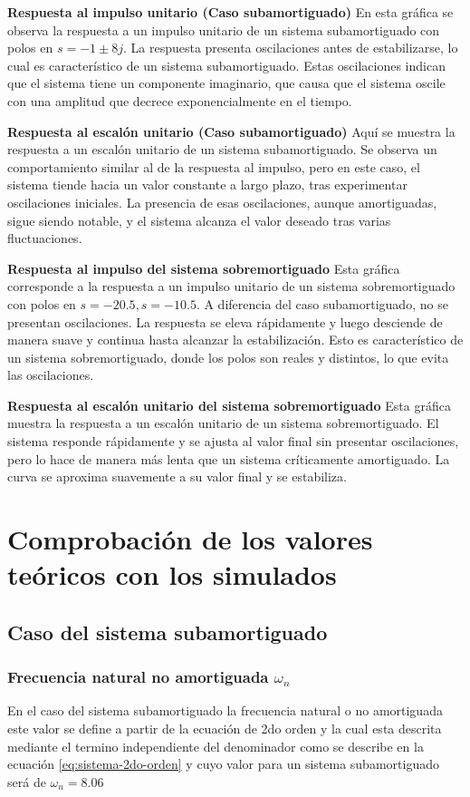 \documentclass[conference]{IEEEtran}
\begin{document}
	\textbf{Respuesta al impulso unitario (Caso subamortiguado)}
	En esta gráfica se observa la respuesta a un impulso unitario de un sistema subamortiguado con polos en $s = -1 \pm 8j$. La respuesta presenta oscilaciones antes de estabilizarse, lo cual es característico de un sistema subamortiguado. Estas oscilaciones indican que el sistema tiene un componente imaginario, que causa que el sistema oscile con una amplitud que decrece exponencialmente en el tiempo.
	
	\textbf{Respuesta al escalón unitario (Caso subamortiguado)}
	Aquí se muestra la respuesta a un escalón unitario de un sistema subamortiguado. Se observa un comportamiento similar al de la respuesta al impulso, pero en este caso, el sistema tiende hacia un valor constante a largo plazo, tras experimentar oscilaciones iniciales. La presencia de esas oscilaciones, aunque amortiguadas, sigue siendo notable, y el sistema alcanza el valor deseado tras varias fluctuaciones.
	
	\textbf{Respuesta al impulso del sistema sobremortiguado}
	Esta gráfica corresponde a la respuesta a un impulso unitario de un sistema sobremortiguado con polos en 
	$ s = -20.5, s = -10.5$. A diferencia del caso subamortiguado, no se presentan oscilaciones. La respuesta se eleva rápidamente y luego desciende de manera suave y continua hasta alcanzar la estabilización. Esto es característico de un sistema sobremortiguado, donde los polos son reales y distintos, lo que evita las oscilaciones.
	
	\textbf{Respuesta al escalón unitario del sistema sobremortiguado}
	Esta gráfica muestra la respuesta a un escalón unitario de un sistema sobremortiguado. El sistema responde rápidamente y se ajusta al valor final sin presentar oscilaciones, pero lo hace de manera más lenta que un sistema críticamente amortiguado. La curva se aproxima suavemente a su valor final y se estabiliza.
	
	\section{Comprobación de los valores teóricos con los simulados}
	\subsection{Caso del sistema subamortiguado}
	\subsubsection{Frecuencia natural no amortiguada $\omega_n$}
	En el caso del sistema subamortiguado la frecuencia natural o no amortiguada este valor se define a partir de la ecuación de 2do orden y la cual esta descrita mediante el termino independiente del denominador como se describe en la ecuación \ref{eq:sistema-2do-orden} y cuyo valor para un sistema subamortiguado será de $\omega_n = 8.06$
	
\end{document}
